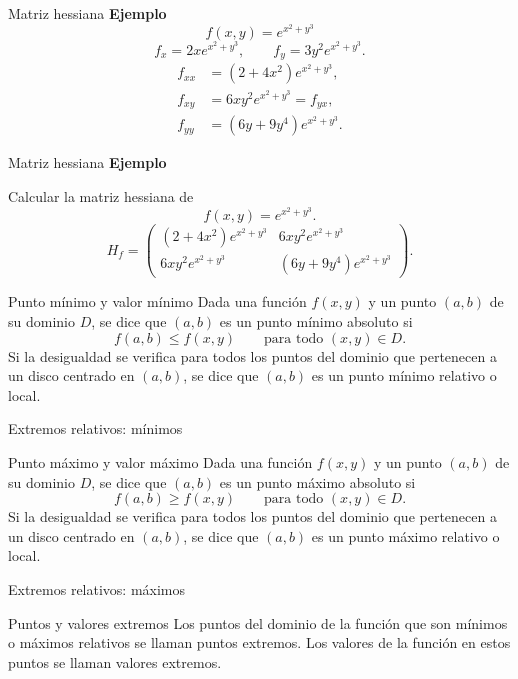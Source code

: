 \documentclass[original_version/main.tex]{subfiles}
\begin{document}
\begin{frame}{Matriz hessiana}
\small\textbf{Ejemplo}\[f(x,y)=e^{x^2+y^3}\]
\[f_x=2xe^{x^2+y^3},\qquad f_y=3y^2e^{x^2+y^3}.\]
\[\begin{aligned}
f_{xx}&=(2+4x^2)e^{x^2+y^3},\\
f_{xy}&=6xy^2e^{x^2+y^3}=f_{yx},\\
f_{yy}&=(6y+9y^4)e^{x^2+y^3}.
\end{aligned}\]
\end{frame}
\begin{frame}{Matriz hessiana}
\textbf{Ejemplo}\par Calcular la matriz hessiana de
\[f(x,y)=e^{x^2+y^3}.\]
\[H_f=\begin{pmatrix}
(2+4x^2)e^{x^2+y^3}&6xy^2e^{x^2+y^3}\\
6xy^2e^{x^2+y^3}&(6y+9y^4)e^{x^2+y^3}
\end{pmatrix}.\]
\end{frame}
\begin{frame}{Punto mínimo y valor mínimo}
Dada una función $f(x,y)$ y un punto $(a,b)$ de su dominio $D$, se dice que $(a,b)$ es un punto mínimo absoluto si
\[f(a,b)\le f(x,y)\qquad\text{para todo }(x,y)\in D.\]
Si la desigualdad se verifica para todos los puntos del dominio que pertenecen a un disco centrado en $(a,b)$, se dice que $(a,b)$ es un punto mínimo relativo o local.
\end{frame}
\begin{frame}{Extremos relativos: mínimos}
\end{frame}
\begin{frame}{Punto máximo y valor máximo}
Dada una función $f(x,y)$ y un punto $(a,b)$ de su dominio $D$, se dice que $(a,b)$ es un punto máximo absoluto si
\[f(a,b)\ge f(x,y)\qquad\text{para todo }(x,y)\in D.\]
Si la desigualdad se verifica para todos los puntos del dominio que pertenecen a un disco centrado en $(a,b)$, se dice que $(a,b)$ es un punto máximo relativo o local.
\end{frame}
\begin{frame}{Extremos relativos: máximos}
\end{frame}
\begin{frame}{Puntos y valores extremos}
Los puntos del dominio de la función que son mínimos o máximos relativos se llaman puntos extremos. Los valores de la función en estos puntos se llaman valores extremos.
\end{frame}
\end{document}
